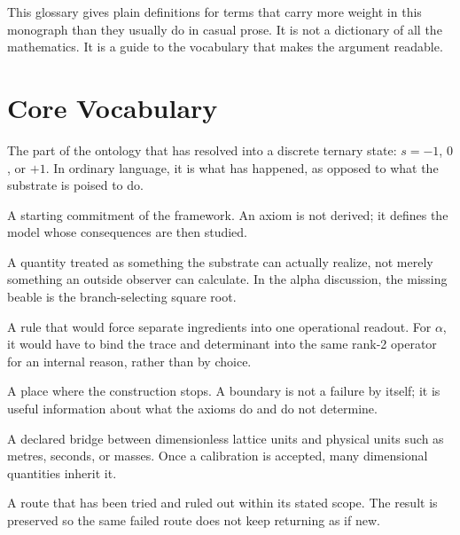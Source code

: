 \noindent This glossary gives plain definitions for terms that carry more weight
in this monograph than they usually do in casual prose. It is not a dictionary of
all the mathematics. It is a guide to the vocabulary that makes the argument
readable.

\section*{Core Vocabulary}

\begin{termnotes}
  \item[Actual.]
  The part of the ontology that has resolved into a discrete ternary state:
  $s=-1$, $0$, or $+1$. In ordinary language, it is what has happened, as
  opposed to what the substrate is poised to do.

  \item[Axiom.]
  A starting commitment of the framework. An axiom is not derived; it defines
  the model whose consequences are then studied.

  \item[Beable.]
  A quantity treated as something the substrate can actually realize, not merely
  something an outside observer can calculate. In the alpha discussion, the
  missing beable is the branch-selecting square root.

  \item[Binding law.]
  A rule that would force separate ingredients into one operational readout. For
  $\alpha$, it would have to bind the trace and determinant into the same
  rank-2 operator for an internal reason, rather than by choice.

  \item[Boundary.]
  A place where the construction stops. A boundary is not a failure by itself;
  it is useful information about what the axioms do and do not determine.

  \item[Calibration.]
  A declared bridge between dimensionless lattice units and physical units such
  as metres, seconds, or masses. Once a calibration is accepted, many dimensional
  quantities inherit it.

  \item[Closed negative.]
  A route that has been tried and ruled out within its stated scope. The result
  is preserved so the same failed route does not keep returning as if new.


\end{termnotes}
